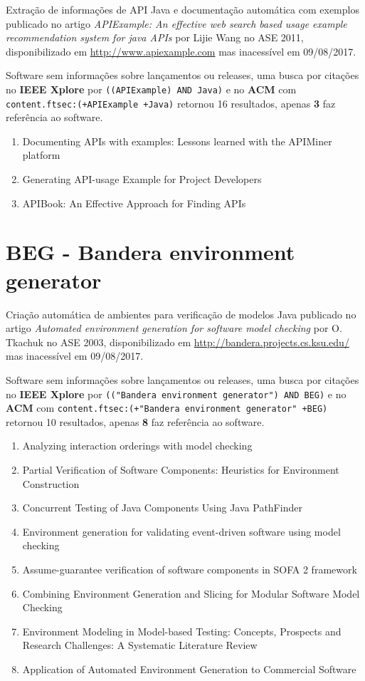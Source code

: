 Extração de informações de API Java e documentação automática com exemplos
publicado no artigo {\it APIExample: An effective web search based usage example recommendation system for java APIs}
por Lijie Wang
no ASE 2011,
disponibilizado em \url{http://www.apiexample.com}
mas inacessível em 09/08/2017.

Software sem informações sobre lançamentos ou releases,
uma busca por citações no {\bf IEEE Xplore} por
\texttt{((APIExample) AND Java)}
e no {\bf ACM} com
\texttt{content.ftsec:(+APIExample +Java)}
retornou
16 resultados, apenas
{\bf 3} faz referência ao software.

\begin{enumerate}
\item Documenting APIs with examples: Lessons learned with the APIMiner platform
\item Generating API-usage Example for Project Developers
\item APIBook: An Effective Approach for Finding APIs
\end{enumerate}


\section{BEG - Bandera environment generator}

Criação automática de ambientes para verificação de modelos Java
publicado no artigo {\it Automated environment generation for software model checking}
por O. Tkachuk
no ASE 2003,
disponibilizado em \url{http://bandera.projects.cs.ksu.edu/}
mas inacessível em 09/08/2017.

Software sem informações sobre lançamentos ou releases,
uma busca por citações no {\bf IEEE Xplore} por
\texttt{(("Bandera environment generator") AND BEG)}
e no {\bf ACM} com
\texttt{content.ftsec:(+"Bandera environment generator" +BEG)}
retornou
10 resultados, apenas
{\bf 8} faz referência ao software.

\begin{enumerate}
\item Analyzing interaction orderings with model checking
\item Partial Verification of Software Components: Heuristics for Environment Construction
\item Concurrent Testing of Java Components Using Java PathFinder
\item Environment generation for validating event-driven software using model checking
\item Assume-guarantee verification of software components in SOFA 2 framework
\item Combining Environment Generation and Slicing for Modular Software Model Checking
\item Environment Modeling in Model-based Testing: Concepts, Prospects and Research Challenges: A Systematic Literature Review
\item Application of Automated Environment Generation to Commercial Software
\end{enumerate}


